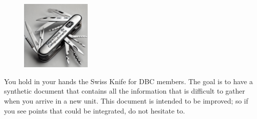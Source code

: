 \documentclass[11pt]{article}
\begin{document}
\maketitle
\begin{figure}[H]
    \centering
    \includegraphics[width=0.3\textwidth]{images/logo.jpeg}
\end{figure}

You hold in your hands the Swiss Knife for DBC members. The goal is to have a synthetic document that contains all the information that is difficult to gather when you arrive in a new unit. This document is intended to be improved; so if you see points that could be integrated, do not hesitate to.\\

\tableofcontents
\newpage


\newpage

\newpage

\newpage

\newpage

\newpage

\newpage

\end{document}
